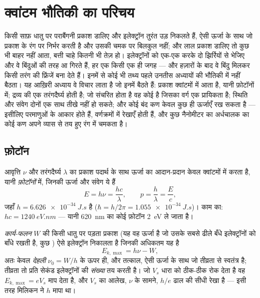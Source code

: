 \chapter{क्वांटम भौतिकी का परिचय}\label{ch:b1:quantum-introduction}

किसी साफ़ धातु पर पराबैंगनी प्रकाश डालिए और इलेक्ट्रॉन तुरंत उड़ निकलते हैं,
ऐसी ऊर्जा के साथ जो प्रकाश के रंग पर निर्भर करती है और उसकी चमक पर बिलकुल
नहीं; और लाल प्रकाश डालिए तो कुछ भी बाहर नहीं आता, बत्ती चाहे कितनी भी तेज़
हो। इलेक्ट्रॉनों को एक-एक करके दो झिर्रियों से भेजिए और वे बिंदुओं की तरह
आ गिरते हैं, हर एक किसी एक ही जगह --- और हज़ारों के बाद वे बिंदु मिलकर किसी
तरंग की फ्रिंजें बना देते हैं। इनमें से कोई भी तथ्य पहले उनतीस अध्यायों की
भौतिकी में नहीं बैठता। यह आख़िरी अध्याय वे विचार लाता है जो इनमें बैठते
हैं: प्रकाश क्वांटमों में आता है, यानी फ़ोटॉनों में; द्रव्य की एक
तरंगदैर्घ्य होती है; जो संचरित होता है वह कोई  है जिसका वर्ग एक
प्रायिकता है; स्थिति और संवेग दोनों एक साथ तीखे नहीं हो सकते; और कोई बंद
कण केवल कुछ ही ऊर्जाएँ रख सकता है --- इसीलिए परमाणुओं के आकार होते हैं,
वर्णक्रमों में रेखाएँ होती हैं, और कुछ नैनोमीटर का अर्धचालक का कोई कण अपने
व्यास से तय हुए रंग में चमकता है।

\section{फ़ोटॉन}

\begin{theorem}[प्लांक--आइंस्टाइन संबंध]\label{thm:b1:quantum-introduction:photon}
आवृत्ति $\nu$ और तरंगदैर्घ्य $\lambda$ का प्रकाश पदार्थ के साथ ऊर्जा का
आदान-प्रदान केवल क्वांटमों में करता है, यानी \emph{फ़ोटॉनों} में, जिनकी
ऊर्जा और संवेग ये हैं
\[
E = h\nu = \frac{hc}{\lambda} , \qquad p = \frac{h}{\lambda} = \frac{E}{c} ,
\]
जहाँ \emph{} $h = \qty{6.626e-34}{J.s}$ है ($\hbar = h/2\pi =
\qty{1.055e-34}{J.s}$)। काम का: $hc = \qty{1240}{eV.nm}$ --- यानी
\qty{620}{nm} का कोई फ़ोटॉन \qty{2}{eV} ले जाता है।
\end{theorem}
\admitted

\begin{proposition}[प्रकाश-विद्युत प्रभाव]\label{prop:b1:quantum-introduction:photoelectric}
\emph{कार्य-फलन} $W$ की किसी धातु पर पड़ता प्रकाश (यह वह ऊर्जा है जो उसके
सबसे ढीले बँधे इलेक्ट्रॉनों को बाँधे रखती है, कुछ ) ऐसे
इलेक्ट्रॉन निकालता है जिनकी अधिकतम  यह है
\[
E_{k,\max} = h\nu - W ,
\]
अतः केवल \emph{देहली} $\nu_0 = W/h$ के ऊपर ही, और तत्काल, ऐसी ऊर्जा के साथ
जो तीव्रता से स्वतंत्र है; तीव्रता तो प्रति सेकंड इलेक्ट्रॉनों की
\emph{संख्या} तय करती है। जो \emph{}
$V_s$ धारा को ठीक-ठीक रोक देता है वह $E_{k,\max} = eV_s$ माप देता है, और
$V_s$ का आलेख, $\nu$ के सामने, $h/e$ ढाल की सीधी रेखा है --- इसी तरह मिलिकन
ने $h$ मापा था।
\end{proposition}

